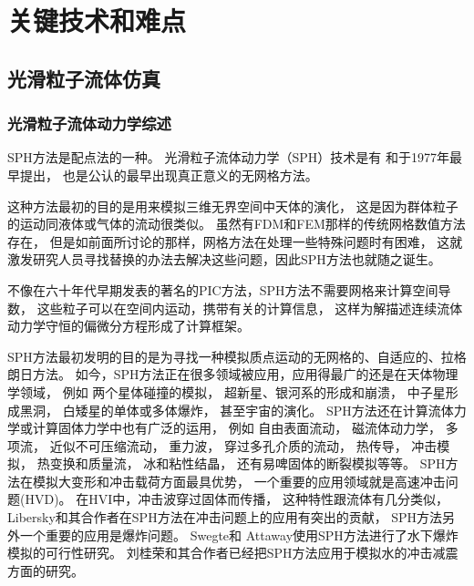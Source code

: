 \chapter{关键技术和难点}
\label{chap:keytechnology}

\section{光滑粒子流体仿真}
\label{sec:sph}

\subsection {光滑粒子流体动力学综述}
\label{subsec:sph-rev}

SPH方法是配点法的一种。
光滑粒子流体动力学（SPH）技术是有\citeauthor{Lucy1977A}
和\citeauthor{Gingold1977Smoothed}于1977年最早提出，
也是公认的最早出现真正意义的无网格方法。

这种方法最初的目的是用来模拟三维无界空间中天体的演化，
这是因为群体粒子的运动同液体或气体的流动很类似。
虽然有FDM和FEM那样的传统网格数值方法存在，
但是如前面所讨论的那样，网格方法在处理一些特殊问题时有困难，
这就激发研究人员寻找替换的办法去解决这些问题，因此SPH方法也就随之诞生。

不像在六十年代早期发表的著名的PIC方法，SPH方法不需要网格来计算空间导数，
这些粒子可以在空间内运动，携带有关的计算信息，
这样为解描述连续流体动力学守恒的偏微分方程形成了计算框架。

SPH方法最初发明的目的是为寻找一种模拟质点运动的无网格的、自适应的、拉格朗日方法。
如今，SPH方法正在很多领域被应用，应用得最广的还是在天体物理学领域，
例如
两个星体碰撞的模拟，
超新星、银河系的形成和崩溃，
中子星形成黑洞，
白矮星的单体或多体爆炸，
甚至宇宙的演化。
SPH方法还在计算流体力学或计算固体力学中也有广泛的运用，
例如
自由表面流动，
磁流体动力学，
多项流，
近似不可压缩流动，
重力波，
穿过多孔介质的流动，
热传导，
冲击模拟，
热变换和质量流，
冰和粘性结晶，
还有易啤固体的断裂模拟等等。
SPH方法在模拟大变形和冲击载荷方面最具优势，
一个重要的应用领域就是高速冲击问题(HVD)。
在HVI中，冲击波穿过固体而传播， 这种特性跟流体有几分类似，
Libersky和其合作者在SPH方法在冲击问题上的应用有突出的贡献，
SPH方法另外一个重要的应用是爆炸问题。
Swegte和 Attaway使用SPH方法进行了水下爆炸模拟的可行性研究。
刘桂荣和其合作者已经把SPH方法应用于模拟水的冲击减震方面的研究。

